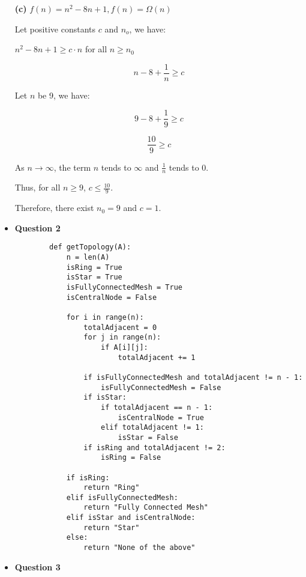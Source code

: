 \documentclass{article}
\begin{document}
\begin{itemize}
    \textbf{(c)} $f(n) = n^2 - 8n + 1, f(n) = \Omega(n)$

    Let positive constants $c$ and $n_o$, we have:

    \begin{center}
        $n^2 - 8n + 1 \ge c\cdot n$ for all $n \ge n_0$
    \end{center}

    $$n - 8 + \frac{1}{n} \ge c$$

    Let $n$ be 9, we have:

    $$9 - 8 + \frac{1}{9} \ge c$$

    $$\frac{10}{9} \ge c$$

    As $n \to \infty$, the term $n$ tends to $\infty$ and $\frac{1}{n}$ tends to $0$.

    Thus, for all $n \ge 9$, $c \le \frac{10}{9}$.

    Therefore, there exist $n_0 = 9$ and $c = 1$.\\


    \item\textbf{ Question 2}
    \begin{lstlisting}
        def getTopology(A):
            n = len(A)
            isRing = True
            isStar = True
            isFullyConnectedMesh = True
            isCentralNode = False

            for i in range(n):
                totalAdjacent = 0
                for j in range(n):
                    if A[i][j]:
                        totalAdjacent += 1

                if isFullyConnectedMesh and totalAdjacent != n - 1:
                    isFullyConnectedMesh = False
                if isStar:
                    if totalAdjacent == n - 1:
                        isCentralNode = True
                    elif totalAdjacent != 1:
                        isStar = False
                if isRing and totalAdjacent != 2:
                    isRing = False

            if isRing:
                return "Ring"
            elif isFullyConnectedMesh:
                return "Fully Connected Mesh"
            elif isStar and isCentralNode:
                return "Star"
            else:
                return "None of the above"

    \end{lstlisting}

    \item\textbf{ Question 3}


\end{itemize}
\end{document}
